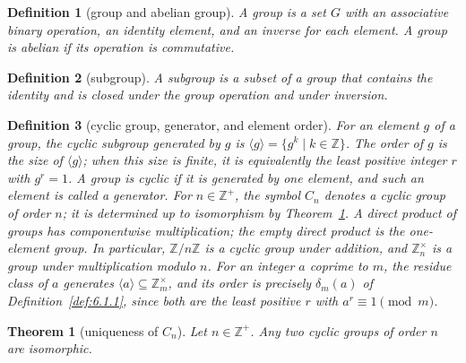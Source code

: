 \documentclass[11pt]{article}
\theoremstyle{ntstyle}
\newtheorem{theorem}{Theorem}[subsection]
\newtheorem{definition}{Definition}[subsection]
\newcommand{\ZmodUnits}[1]{\mathbb{Z}_{#1}^{\times}}
\begin{document}
\begin{definition}[group and abelian group]\label{def:6.6.1}
	A group is a set $G$ with an associative binary operation, an identity
	element, and an inverse for each element. A group is abelian if its
	operation is commutative.

\end{definition}
\begin{definition}[subgroup]\label{def:6.6.2}
	A subgroup is a subset of a group that contains the identity and is
	closed under the group operation and under inversion.

\end{definition}
\begin{definition}[cyclic group, generator, and element order]\label{def:6.6.3}
	For an element $g$ of a group, the cyclic subgroup generated by $g$ is
	$\langle g\rangle=\{g^k\mid k\in\mathbb{Z}\}$. The order of $g$ is the
	size of $\langle g\rangle$; when this size is finite, it is equivalently
	the least positive integer $r$ with $g^r=1$. A group is cyclic if it is
	generated by one element, and such an element is called a generator.
	For $n\in\mathbb{Z}^+$, the symbol $C_n$ denotes a cyclic group of order $n$;
	it is determined up to isomorphism by Theorem~\ref{thm:6.6.1}.
	A direct product of groups has componentwise multiplication; the empty
	direct product is the one-element group.
	In particular, $\mathbb{Z}/n\mathbb{Z}$ is a cyclic group under addition,
	and $\ZmodUnits{n}$ is a group under multiplication modulo $n$. For an
	integer $a$ coprime to $m$, the residue class of $a$ generates
	$\langle a\rangle\subseteq\ZmodUnits{m}$, and its order is precisely
	$\delta_m(a)$ of Definition~\ref{def:6.1.1}, since both are the least
	positive $r$ with $a^r\equiv1\pmod m$.

\end{definition}
\begin{theorem}[uniqueness of $C_n$]\label{thm:6.6.1}
	Let $n\in\mathbb{Z}^+$. Any two cyclic groups of order $n$ are isomorphic.

\end{theorem}
\end{document}
